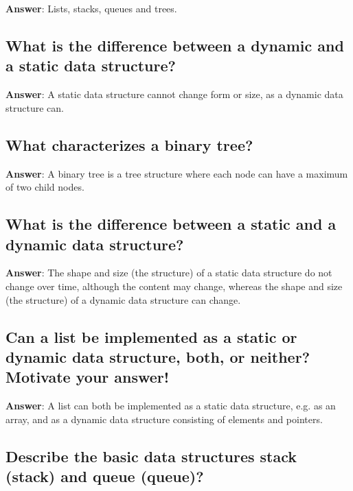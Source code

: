 \documentclass[a4paper,11pt,oneside]{article}
\begin{document}
\begin{sloppypar}
\label{q:253:sa:en:True}

\textbf{Answer}: Lists, stacks, queues and trees.



\subsection{What is the difference between a dynamic and a static data structure?}

\label{q:254:sa:en:True}

\textbf{Answer}: A static data structure cannot change form or size, as a dynamic data structure can.



\subsection{What characterizes a binary tree?}

\label{q:255:sa:en:True}

\textbf{Answer}: A binary tree is a tree structure where each node can have a maximum of two child nodes.



\subsection{What is the difference between a static and a dynamic data structure?}

\label{q:256:sa:en:True}

\textbf{Answer}: The shape and size (the structure) of a static data structure do not change over time, although the content may change, whereas the shape and size (the structure) of a dynamic data structure can change.



\subsection{Can a list be implemented as a static or dynamic data structure, both, or neither? Motivate your answer!}

\label{q:257:sa:en:True}

\textbf{Answer}: A list can both be implemented as a static data structure, e.g. as an array, and as a dynamic data structure consisting of elements and pointers.



\subsection{Describe the basic data structures stack (stack) and queue (queue)?}


\end{sloppypar}
\end{document}
